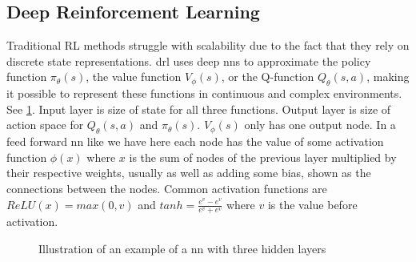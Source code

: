 \documentclass[UKenglish]{uiomasterthesis}
\begin{document}
\subsection{Deep Reinforcement Learning}
Traditional RL methods struggle with scalability due to the fact that they rely on discrete state representations. \ac{drl} uses deep \acp{nn} to approximate the policy function $\pi_\theta(s)$, the value function $V_\phi(s)$, or the Q-function $Q_\theta(s,a)$, making it possible to represent these functions in continuous and complex environments. See \cref{fig:neural_network}. Input layer is size of state for all three functions. Output layer is size of action space for $Q_\theta(s,a)$ and $\pi_\theta(s)$. $V_\phi(s)$ only has one output node. In a feed forward \ac{nn} like we have here each node has the value of some activation function $\phi(x)$ where $x$ is the sum of nodes of the previous layer multiplied by their respective weights, usually as well as adding some bias, shown as the connections between the nodes. Common activation functions are $ReLU(x) = max(0,v)$ and $tanh=\frac{e^v-e^v}{e^v+e^v}$ where $v$ is the value before activation.
\begin{figure}[H]
    \centering
    \caption{Illustration of an example of a \ac{nn} with three hidden layers}
    \label{fig:neural_network}
\end{figure}
\end{document}
